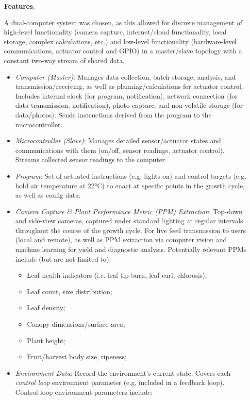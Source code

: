 \textbf{Features}:

A dual-computer system was chosen, as this allowed for discrete management of high-level functionality (camera capture, internet/cloud functionality, local storage, complex calculations, etc.) and low-level functionality (hardware-level communications, actuator control and GPIO) in a master/slave topology with a constant two-way stream of shared data.

\begin{itemize}
    \item \textit{Computer (Master)}: Manages data collection, batch storage, analysis, and transmission/receiving, as well as planning/calculations for actuator control. Includes internal clock (for program, notification), network connection (for data transmission, notification), photo capture, and non-volatile storage (for data/photos). Sends instructions derived from the program to the microcontroller.
    \item \textit{Microcontroller (Slave)}: Manages detailed sensor/actuator states and communications with them (on/off, sensor readings, actuator control). Streams collected sensor readings to the computer.
    \item \textit{Program}: Set of actuated instructions (e.g. lights on) and control targets (e.g. hold air temperature at 22°C) to enact at specific points in the growth cycle, as well as config data;
    \item \textit{Camera Capture \& Plant Performance Metric (PPM) Extraction}: Top-down and side-view cameras, captured under standard lighting at regular intervals throughout the course of the growth cycle. For live feed transmission to users (local and remote), as well as PPM extraction via computer vision and machine learning for yield and diagnostic analysis. Potentially relevant PPMs include (but are not limited to):
    \begin{itemize}
        \item Leaf health indicators (i.e. leaf tip burn, leaf curl, chlorosis);
        \item Leaf count, size distribution;
        \item Leaf density;
        \item Canopy dimensions/surface area;
        \item Plant height;
        \item Fruit/harvest body size, ripeness;
    \end{itemize}
    \item \textit{Environment Data}: Record the environment's current state. Covers each \textit{control loop} environment parameter (e.g. included in a feedback loop). Control loop environment parameters include:

\end{itemize}
